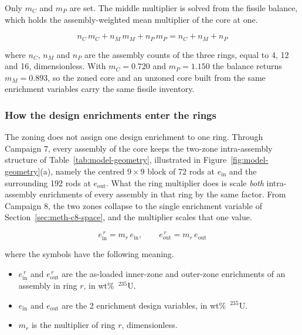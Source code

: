 Only $m_C$ and $m_P$ are set. The middle multiplier is solved from the
fissile balance, which holds the assembly-weighted mean multiplier of
the core at one.

\begin{equation}
n_C\,m_C + n_M\,m_M + n_P\,m_P = n_C + n_M + n_P
\label{eq:zoning-balance}
\end{equation}

\noindent where $n_C$, $n_M$ and $n_P$ are the assembly counts of the
three rings, equal to 4, 12 and 16, dimensionless. With $m_C = 0.720$
and $m_P = 1.150$ the balance returns $m_M = 0.893$, so the zoned core
and an unzoned core built from the same enrichment variables carry the
same fissile inventory.

\subsubsection{How the design enrichments enter the rings}
\label{sec:meth-zoning-map}

The zoning does not assign one design enrichment to one ring. Through
Campaign 7, every assembly of the core keeps the two-zone
intra-assembly structure of Table~\ref{tab:model-geometry}, illustrated in
Figure~\ref{fig:model-geometry}(a), namely the centred $9\times9$ block
of 72 rods at $e_\mathrm{in}$ and the surrounding 192 rods at
$e_\mathrm{out}$. What the ring multiplier does is scale \emph{both}
intra-assembly enrichments of every assembly in that ring by the same
factor. From Campaign 8, the two zones collapse to the single enrichment
variable of Section~\ref{sec:meth-c8-space}, and the multiplier scales
that one value.

\begin{equation}
e_\mathrm{in}^{\,r} = m_r \, e_\mathrm{in},
\qquad
e_\mathrm{out}^{\,r} = m_r \, e_\mathrm{out}
\label{eq:zoning-pair}
\end{equation}

\noindent where the symbols have the following meaning.

\begin{itemize}
  \item $e_\mathrm{in}^{\,r}$ and $e_\mathrm{out}^{\,r}$ are the
        as-loaded inner-zone and outer-zone enrichments of an assembly
        in ring $r$, in wt\%~$^{235}$U.

  \item $e_\mathrm{in}$ and $e_\mathrm{out}$ are the 2 enrichment
        design variables, in wt\%~$^{235}$U.

  \item $m_r$ is the multiplier of ring $r$, dimensionless.
\end{itemize}

